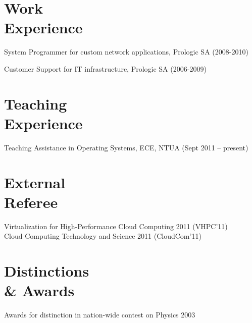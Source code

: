 \documentclass[margin,centered]{res}
\newenvironment{list1}{
  \begin{list}{\ding{71}}{%
      \setlength{\itemsep}{0in}
      \setlength{\parsep}{0in} \setlength{\parskip}{0in}
      \setlength{\topsep}{0in} \setlength{\partopsep}{0in} 
      \setlength{\leftmargin}{0.17in}}}{\end{list}}
\begin{document}
\begin{resume}
\section{\sc Work\\Experience}
\begin{list1}
\item 
System Programmer for custom network applications, Prologic SA (2008-2010)
\item 
Customer Support for IT infrastructure, Prologic SA (2006-2009)
\end{list1}

\section{\sc Teaching\\Experience}
Teaching Assistance in Operating Systems, ECE, NTUA (Sept 2011 – present)

\section{\sc External\\Referee}
Virtualization for High-Performance Cloud Computing 2011 (VHPC'11)\\
Cloud Computing Technology and Science 2011 (CloudCom'11)


\section{\sc Distinctions\\\& Awards}
Awards for distinction in nation-wide contest on Physics 2003

\end{resume}
\end{document}
